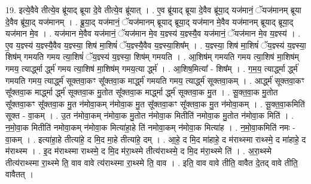 \documentclass[17pt]{extarticle}
\begin{document}
19. इत्ये॒वैवे तीत्ये॒व ब्रू॑याद् ब्रूया दे॒वे तीत्ये॒व ब्रू॑यात् । . ए॒व ब्रू॑याद् ब्रूया दे॒वैव ब्रू॑या॒द् यज॑मानं॒ ॅयज॑मानम् ब्रूया दे॒वैव ब्रू॑या॒द् यज॑मानम् । . ब्रू॒या॒द् यज॑मानं॒ ॅयज॑मानम् ब्रूयाद् ब्रूया॒द् यज॑मान मे॒वैव यज॑मानम् ब्रूयाद् ब्रूया॒द् यज॑मान मे॒व । . यज॑मान मे॒वैव यज॑मानं॒ ॅयज॑मान मे॒व य॒ज्ञ्स्य॑ य॒ज्ञ्स्यै॒व यज॑मानं॒ ॅयज॑मान मे॒व य॒ज्ञ्स्य॑ । . ए॒व य॒ज्ञ्स्य॑ य॒ज्ञ्स्यै॒वैव य॒ज्ञ्स्या॒ शिष॑ मा॒शिषं॑ ॅय॒ज्ञ्स्यै॒वैव य॒ज्ञ्स्या॒शिष᳚म् । . य॒ज्ञ्स्या॒ शिष॑ मा॒शिषं॑ ॅय॒ज्ञ्स्य॑ य॒ज्ञ्स्या॒ शिष॑म् गमयति गमय त्या॒शिषं॑ ॅय॒ज्ञ्स्य॑ य॒ज्ञ्स्या॒ शिष॑म् गमयति । . आ॒शिष॑म् गमयति गमय त्या॒शिष॑ मा॒शिष॑म् गमय॒ त्यार्द्ध्मा र्द्ध्म॑ गमय त्या॒शिष॑ मा॒शिष॑म् गमय॒त्या र्द्ध्म॑ । . आ॒शिष॒मित्या᳚ - शिष᳚म् । . ग॒म॒य॒ त्यार्द्ध्मा र्द्ध्म॑ गमयति गमय॒ त्यार्द्ध्म॑ सूक्तवा॒कꣳ सू᳚क्तवा॒क मार्द्ध्म॑ गमयति गमय॒ त्यार्द्ध्म॑ सूक्तवा॒कम् । . आर्द्ध्म॑ सूक्तवा॒कꣳ सू᳚क्तवा॒क मार्द्ध्मा र्द्ध्म॑ सूक्तवा॒क मु॒तोत सू᳚क्तवा॒क मार्द्ध्मा र्द्ध्म॑ सूक्तवा॒क मु॒त । . सू॒क्त॒वा॒क मु॒तोत सू᳚क्तवा॒कꣳ सू᳚क्तवा॒क मु॒त न॑मोवा॒कम् न॑मोवा॒क मु॒त सू᳚क्तवा॒कꣳ सू᳚क्तवा॒क मु॒त न॑मोवा॒कम् । . सू॒क्त॒वा॒कमिति॑ सूक्त - वा॒कम् । . उ॒त न॑मोवा॒कम् न॑मोवा॒क मु॒तोत न॑मोवा॒क मितीति॑ नमोवा॒क मु॒तोत न॑मोवा॒क मिति॑ । . न॒मो॒वा॒क मितीति॑ नमोवा॒कम् न॑मोवा॒क मित्या॑हा॒हे ति॑ नमोवा॒कम् न॑मोवा॒क मित्या॑ह । . न॒मो॒वा॒कमिति॑ नमः - वा॒कम् । . इत्या॑हा॒हे तीत्या॑हे॒ द मि॒द मा॒हे तीत्या॑हे॒ दम् । . आ॒हे॒ द मि॒द मा॑हाहे॒ द म॑राथ्स्मा राथ्स्मे॒ द मा॑हाहे॒ द म॑राथ्स्म । . इ॒द म॑राथ्स्मा राथ्स्मे॒ द मि॒द म॑रा॒थ्स्मे तीत्य॑राथ्स्मे॒ द मि॒द म॑रा॒थ्स्मे ति॑ । . अ॒रा॒थ्स्मे तीत्य॑राथ्स्मा रा॒थ्स्मे ति॒ वाव वावे त्य॑राथ्स्मा रा॒थ्स्मे ति॒ वाव । . इति॒ वाव वावे तीति॒ वावैत दे॒तद् वावे तीति॒ वावैतत् । \newline
\end{document}
